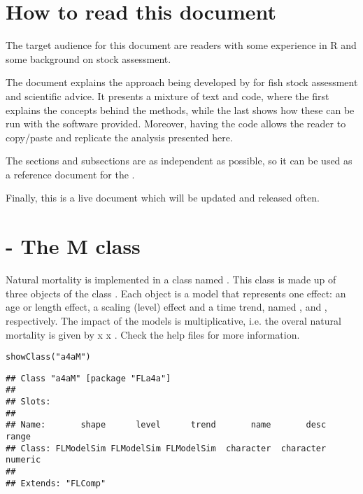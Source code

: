 \documentclass[a4paper,english,10pt]{article}\usepackage[]{graphicx}\usepackage[]{color}
\makeatletter
\newcommand{\hlstr}[1]{\textcolor[rgb]{0.063,0.58,0.627}{#1}}%
\newcommand{\hlstd}[1]{\textcolor[rgb]{0.196,0.196,0.196}{#1}}%
\newcommand{\hlkwd}[1]{\textcolor[rgb]{0.78,0.227,0.412}{#1}}%
\newenvironment{kframe}{%
 \def\at@end@of@kframe{}%
 \ifinner\ifhmode%
  \def\at@end@of@kframe{\end{minipage}}%
  \begin{minipage}{\columnwidth}%
 \fi\fi%
 \def\FrameCommand##1{\hskip\@totalleftmargin \hskip-\fboxsep
 \colorbox{shadecolor}{##1}\hskip-\fboxsep
     \hskip-\linewidth \hskip-\@totalleftmargin \hskip\columnwidth}%
 \MakeFramed {\advance\hsize-\width
   \@totalleftmargin\z@ \linewidth\hsize
   \@setminipage}}%
 {\par\unskip\endMakeFramed%
 \at@end@of@kframe}
\newenvironment{knitrout}{}{} %
\makeatother
\begin{document}
\section{How to read this document}

The target audience for this document are readers with some experience in R and some background on stock assessment.

The document explains the approach being developed by \aFa for fish stock assessment and scientific advice. It presents a mixture of text and code, where the first explains the concepts behind the methods, while the last shows how these can be run with the software provided. Moreover, having the code allows the reader to copy/paste and replicate the analysis presented here.

The sections and subsections are as independent as possible, so it can be used as a reference document for the . 



Finally, this is a live document which will be updated and released often.



\section{ - The M class}

Natural mortality is implemented in a class named . This class is made up of three objects of the class . Each object is a model that represents one effect: an age or length effect, a scaling (level) effect and a time trend, named ,  and , respectively. The impact of the models is multiplicative, i.e. the overal natural mortality is given by  x   x . Check the help files for more information.

\begin{knitrout}
\color{fgcolor}\begin{kframe}
\begin{alltt}
\hlkwd{showClass}\hlstd{(}\hlstr{"a4aM"}\hlstd{)}
\end{alltt}
\begin{verbatim}
## Class "a4aM" [package "FLa4a"]
## 
## Slots:
##                                                                         
## Name:       shape      level      trend       name       desc      range
## Class: FLModelSim FLModelSim FLModelSim  character  character    numeric
## 
## Extends: "FLComp"
\end{verbatim}
\end{kframe}
\end{knitrout}
\end{document}
